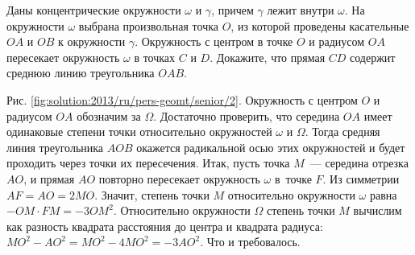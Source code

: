 \problem
Даны концентрические окружности $\omega$ и $\gamma$, причем $\gamma$ лежит
внутри $\omega$.
На окружности $\omega$ выбрана произвольная точка $O$, из которой проведены
касательные $OA$ и $OB$ к окружности $\gamma$.
Окружность с центром в точке $O$ и радиусом $OA$ пересекает окружность $\omega$
в точках $C$ и $D$.
Докажите, что прямая $CD$ содержит среднюю линию треугольника $OAB$.

%
\label{solution:2013/ru/pers-geomt/senior/2}
Рис. \ref{fig:solution:2013/ru/pers-geomt/senior/2}.
Окружность с центром $O$ и радиусом $OA$ обозначим за $\Omega$.
Достаточно проверить, что середина $OA$ имеет одинаковые степени точки
относительно окружностей $\omega$ и $\Omega$.
Тогда средняя линия треугольника $AOB$ окажется радикальной осью этих
окружностей и будет проходить через точки их пересечения.
Итак, пусть точка $M$~--- середина отрезка $AO$, и прямая $AO$ повторно
пересекает окружность $\omega$ в~точке $F$.
Из симметрии $AF = AO = 2 MO$.
Значит, степень точки $M$ относительно окружности $\omega$ равна
$- OM \cdot FM = - 3 OM^2$.
Относительно окружности $\Omega$ степень точки $M$ вычислим как разность
квадрата расстояния до центра и квадрата радиуса:
$MO^2 - AO^2 = MO^2 - 4 MO^2 = - 3 AO^2$.
Что и требовалось.
\endproblem
